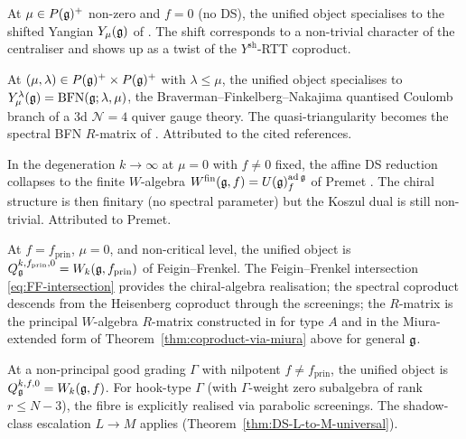 \begin{proposition}
\label{prop:fibre-shifted-yangian}
\ClaimStatusProvedHere
At $\mu \in P(\mathfrak{g})^{+}$ non-zero and $f = 0$ (no DS), the unified
object specialises to the shifted Yangian $Y_{\mu}(\mathfrak{g})$ of
\cite{BrundanKleshchev06,KamnitzerTappeWeekes14}. The shift
corresponds to a non-trivial character of the centraliser and shows up
as a twist of the $Y^{\mathrm{sh}}$-RTT coproduct.
\end{proposition}

\begin{proposition}
\label{prop:fibre-bfn}
\ClaimStatusProvedElsewhere
At $(\mu, \lambda)\in P(\mathfrak{g})^{+}\times P(\mathfrak{g})^{+}$ with
$\lambda\le \mu$, the unified object specialises to
$Y^{\lambda}_{\mu}(\mathfrak{g}) = \mathrm{BFN}(\mathfrak{g}; \lambda, \mu)$, the
Braverman--Finkelberg--Nakajima \cite{BFN19a} quantised Coulomb
branch of a 3d $\mathcal{N}=4$ quiver gauge theory. The
quasi-triangularity becomes the spectral BFN $R$-matrix of
\cite{FinkelbergTsymbaliuk20}. Attributed to the cited references.
\end{proposition}

\begin{proposition}
\label{prop:fibre-finite-W}
\ClaimStatusProvedElsewhere
In the degeneration $k\to\infty$ at $\mu = 0$ with $f\neq 0$ fixed, the
affine DS reduction collapses to the finite $W$-algebra
$W^{\mathrm{fin}}(\mathfrak{g}, f) = U(\mathfrak{g})^{\mathrm{ad}\,\mathfrak{g}}_{f}$ of Premet
\cite{Premet02}. The chiral structure is then finitary
(no spectral parameter) but the Koszul dual is still non-trivial.
Attributed to Premet.
\end{proposition}

\begin{proposition}
\label{prop:fibre-principal-W}
\ClaimStatusProvedHere
At $f = f_{\mathrm{prin}}$, $\mu = 0$, and non-critical level, the
unified object is $Q_{\mathfrak{g}}^{k,f_{\mathrm{prin}},0} =
W_k(\mathfrak{g}, f_{\mathrm{prin}})$ of Feigin--Frenkel. The Feigin--Frenkel
intersection \eqref{eq:FF-intersection} provides the chiral-algebra
realisation; the spectral coproduct descends from the Heisenberg
coproduct through the screenings; the $R$-matrix is the principal
$W$-algebra $R$-matrix constructed in
\cite[Theorem 6.2]{JindalKaubrysLatyntsev26} for type $A$ and in the
Miura-extended form of Theorem~\ref{thm:coproduct-via-miura} above for
general $\mathfrak{g}$.
\end{proposition}

\begin{proposition}
\label{prop:fibre-nonprincipal-W}
\ClaimStatusProvedHere
At a non-principal good grading $\Gamma$ with nilpotent $f\neq
f_{\mathrm{prin}}$, the unified object is
$Q_{\mathfrak{g}}^{k,f,0} = W_k(\mathfrak{g}, f)$. For hook-type $\Gamma$
(with $\Gamma$-weight zero subalgebra of rank $r\le N-3$), the fibre
is explicitly realised via \cite{KacRoanWakimoto03, Arakawa07}
parabolic screenings. The shadow-class escalation $L\to M$ applies
(Theorem~\ref{thm:DS-L-to-M-universal}).
\end{proposition}


